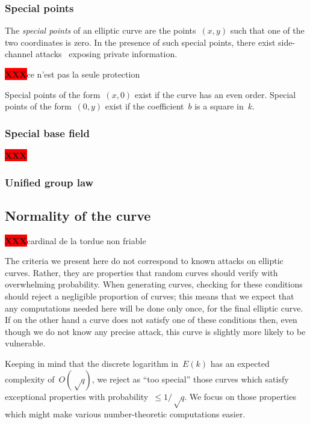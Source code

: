 \documentclass{article}
\def\XXX{{\colorbox{red}{{\color{white}\bfseries XXX}}}}
\begin{document}
\subsubsection{Special points}
\label{sss:special-points}

The \emph{special points} of an elliptic curve
are the points~$(x,y)$ such that one of the two coordinates is zero.
In the presence of such special points,
there exist side-channel attacks~\cite{pkc2003goubin}
exposing private information.

\XXX ce n'est pas la seule protection

Special points of the form~$(x, 0)$ exist if the curve has
an even order.
Special points of the form~$(0, y)$ exist if the coefficient~$b$
is a square in~$k$.

\subsubsection{Special base field}
\label{sss:special-side}

\XXX

\subsubsection{Unified group law}
\label{sss:unified}

\subsection{Normality of the curve}
\label{ss:normal}

\XXX cardinal de la tordue non friable

The criteria we present here do not correspond to
known attacks on elliptic curves.
Rather, they are properties that random curves should verify
with overwhelming probability.
When generating curves, checking for these conditions
should reject a negligible proportion of curves;
this means that we expect that any computations needed here
will be done only once, for the final elliptic curve.
If on the other hand a curve does not satisfy one of these conditions
then, even though we do not know any precise attack,
this curve is slightly more likely to be vulnerable.

Keeping in mind that the discrete logarithm in~$E(k)$
has an expected complexity of~$O(√q)$,
we reject as ``too special'' those curves
which satisfy exceptional properties with probability~$≤ 1/√q$.
We focus on those properties which might make
various number-theoretic computations easier.
\end{document}
